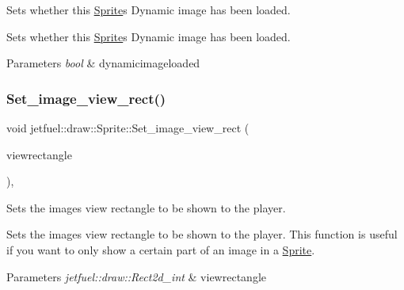 Sets whether this \hyperlink{classjetfuel_1_1draw_1_1Sprite}{Sprite}\textquotesingle{}s Dynamic image has been loaded. 

Sets whether this \hyperlink{classjetfuel_1_1draw_1_1Sprite}{Sprite}\textquotesingle{}s Dynamic image has been loaded.


\begin{DoxyParams}{Parameters}
{\em bool} & dynamicimageloaded \\
\hline
\end{DoxyParams}
\mbox{\label{classjetfuel_1_1draw_1_1Sprite_a684ee9b8ae0faa03878cb4b2f9e0ea19}} 
\subsubsection{\texorpdfstring{Set\+\_\+image\+\_\+view\+\_\+rect()}{Set\_image\_view\_rect()}}
{\footnotesize\ttfamily void jetfuel\+::draw\+::\+Sprite\+::\+Set\+\_\+image\+\_\+view\+\_\+rect (\begin{DoxyParamCaption}\item[{const \hyperlink{classjetfuel_1_1draw_1_1Rect2d}{Rect2d\+\_\+int}}]{viewrectangle }\end{DoxyParamCaption})\hspace{0.3cm}{\ttfamily [inline]}, {\ttfamily [protected]}}



Sets the image\textquotesingle{}s view rectangle to be shown to the player. 

Sets the image\textquotesingle{}s view rectangle to be shown to the player. This function is useful if you want to only show a certain part of an image in a \hyperlink{classjetfuel_1_1draw_1_1Sprite}{Sprite}.


\begin{DoxyParams}{Parameters}
{\em jetfuel\+::draw\+::\+Rect2d\+\_\+int} & viewrectangle \\
\hline
\end{DoxyParams}
\mbox{\label{classjetfuel_1_1draw_1_1Sprite_ad9e1cb6483d8ca4de5e3d7e72ca41973}} 
